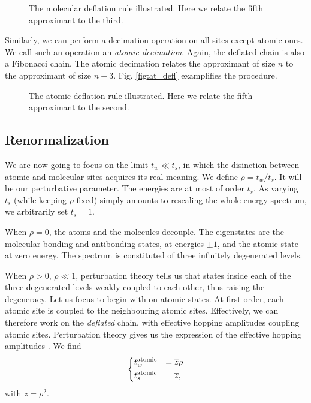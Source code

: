 \documentclass[aps,prl,preprint]{revtex4-1}
\newcommand{\zb}{\ensuremath{\overline{z}}}
\begin{document}
\begin{figure}[htp]
	
	\caption{The molecular deflation rule illustrated. Here we relate the fifth approximant to the third.}
\label{fig:mol_defl}
\end{figure}

Similarly, we can perform a decimation operation on all sites except atomic ones. We call such an operation an \emph{atomic decimation}.
Again, the deflated chain is also a Fibonacci chain.
The atomic decimation relates the approximant of size $n$ to the approximant of size $n-3$. 
Fig. \eqref{fig:at_defl} examplifies the procedure.

\begin{figure}[htp]
	
	\caption{The atomic deflation rule illustrated. Here we relate the fifth approximant to the second.}
\label{fig:at_defl}
\end{figure}

\subsection{Renormalization}

We are now going to focus on the limit $t_w \ll t_s$, in which the disinction between atomic and molecular sites acquires its real meaning.
We define $\rho = t_w/t_s$. It will be our perturbative parameter.
The energies are at most of order $t_s$. As varying $t_s$ (while keeping $\rho$ fixed) simply amounts to rescaling the whole energy spectrum, we arbitrarily set $t_s = 1$. 

When $\rho = 0$, the atoms and the molecules decouple. The eigenstates are the molecular bonding and antibonding states, at energies $\pm 1$, and the atomic state at zero energy.
The spectrum is constituted of three infinitely degenerated levels.

When $\rho > 0$, $\rho \ll 1$, perturbation theory tells us that states inside each of the three degenerated levels weakly coupled to each other, thus raising the degeneracy.
Let us focus to begin with on atomic states. At first order, each atomic site is coupled to the neighbouring atomic sites.
Effectively, we can therefore work on the \emph{deflated} chain, with effective hopping amplitudes coupling atomic sites. Perturbation theory gives us the expression of the effective hopping amplitudes \cite{Niu1990}.
We find
\begin{equation}
	\begin{dcases}
	t^\text{atomic}_w &= \zb \rho\\
	t^\text{atomic}_s &= \zb,
	\end{dcases}
\end{equation}
with $\zb =\rho^2$.
\end{document}
